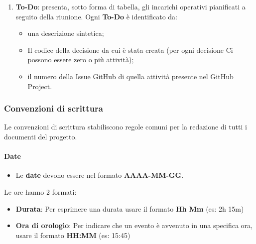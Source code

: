 \documentclass[a4paper,12pt]{article}
\begin{document}
\begin{enumerate}
\begin{itemize}
    \item \textbf{fase}, indica la fase di progetto a cui si riferisce;
    \item \textbf{Y}, indica il numero del Verbale in riferimento a quella revisione;
    \item \textbf{X} indica il numero della decisione interna a quel documento.
\end{itemize}
  \item \textbf{To-Do}: presenta, sotto forma di tabella, gli incarichi operativi pianificati a seguito della riunione. Ogni \textbf{To-Do} è identificato da:
  \begin{itemize}
      \item una descrizione sintetica;
      \item Il codice della decisione da cui è stata creata (per ogni decisione Ci possono essere zero o più attività);
      \item il numero della Issue GitHub di quella attività presente nel GitHub Project.
  \end{itemize}
\end{enumerate}

\subsubsection*{Convenzioni di scrittura} \label{subsubsec:convenzioni-scrittura}
Le convenzioni di scrittura stabiliscono regole comuni per la redazione di tutti i documenti del progetto.
\paragraph{Date}
\begin{itemize}
    \item Le \textbf{date} devono essere nel formato \textbf{AAAA-MM-GG}. 
\end{itemize}
Le ore hanno 2 formati:
\begin{itemize}
    \item \textbf{Durata}: Per esprimere una durata usare il formato \textbf{Hh Mm} (es: 2h 15m)
    \item \textbf{Ora di orologio}: Per indicare che un evento è avvenuto in una specifica ora, usare il formato \textbf{HH:MM} (es: 15:45)
\end{itemize}
\end{document}
